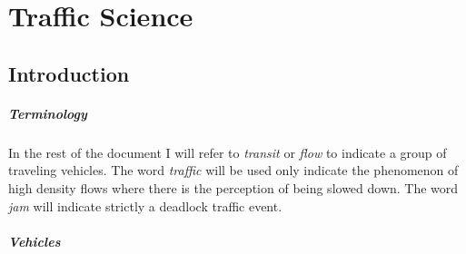 \chapter{Traffic Science}

\section{Introduction}

\paragraph{Terminology}

In the rest of the document I will refer to \textit{transit} or \textit{flow} to indicate a group of traveling vehicles.
The word \textit{traffic} will be used only indicate the phenomenon of high density flows where there is the perception of being slowed down.
The word \textit{jam} will indicate strictly a deadlock traffic event.

\paragraph{Vehicles}

